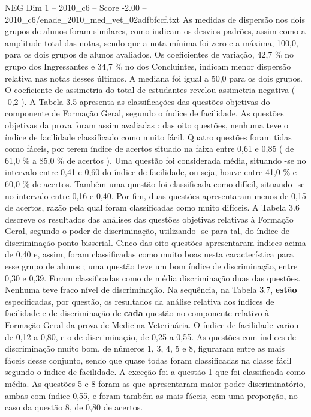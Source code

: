 \begin{textsample}{NEG Dim 1 – 2010\_c6 – Score -2.00 – 2010\_c6/enade\_2010\_med\_vet\_02adfbfccf.txt}
As medidas de dispersão nos dois grupos de alunos foram similares, como indicam os desvios padrões, assim como a amplitude total das notas, sendo que a nota mínima foi zero e a máxima, 100,0, para os dois grupos de alunos avaliados.
Os coeficientes de variação, 42,7 \% no grupo dos Ingressantes e 34,7 \% no dos Concluintes, indicam menor dispersão relativa nas notas desses últimos.
A mediana foi igual a 50,0 para os dois grupos.
O coeficiente de assimetria do total de estudantes revelou assimetria negativa ( -0,2 ).
A Tabela 3.5 apresenta as classificações das questões objetivas do componente de Formação Geral, segundo o índice de facilidade.
As questões objetivas da prova foram assim avaliadas : das oito questões, nenhuma teve o índice de facilidade classificado como muito fácil.
Quatro questões foram tidas como fáceis, por terem índice de acertos situado na faixa entre 0,61 e 0,85 ( de 61,0 \% a 85,0 \% de acertos ).
Uma questão foi considerada média, situando -se no intervalo entre 0,41 e 0,60 do índice de facilidade, ou seja, houve entre 41,0 \% e 60,0 \% de acertos.
Também uma questão foi classificada como difícil, situando -se no intervalo entre 0,16 e 0,40.
Por fim, duas questões apresentaram menos de 0,15 de acertos, razão pela qual foram classificadas como muito difíceis.
A Tabela 3.6 descreve os resultados das análises das questões objetivas relativas à Formação Geral, segundo o poder de discriminação, utilizando -se para tal, do índice de discriminação ponto bisserial.
Cinco das oito questões apresentaram índices acima de 0,40 e, assim, foram classificadas como muito boas nesta característica para esse grupo de alunos ; uma questão teve um bom índice de discriminação, entre 0,30 e 0,39.
Foram classificadas como de média discriminação duas das questões.
Nenhuma teve fraco nível de discriminação.
Na sequência, na Tabela 3.7, \textbf{estão} especificadas, por questão, os resultados da análise relativa aos índices de facilidade e de discriminação de \textbf{cada} questão no componente relativo à Formação Geral da prova de Medicina Veterinária.
O índice de facilidade variou de 0,12 a 0,80, e o de discriminação, de 0,25 a 0,55.
As questões com índices de discriminação muito bom, de números 1, 3, 4, 5 e 8, figuraram entre as mais fáceis desse conjunto, sendo que quase todas foram classificadas na classe fácil segundo o índice de facilidade.
A exceção foi a questão 1 que foi classificada como média.
As questões 5 e 8 foram as que apresentaram maior poder discriminatório, ambas com índice 0,55, e foram também as mais fáceis, com uma proporção, no caso da questão 8, de 0,80 de acertos.

\end{textsample}
